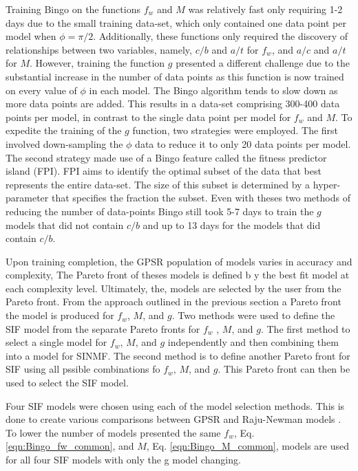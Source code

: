 Training Bingo on the functions $f_w$ and $M$ was relatively fast only requiring 1-2 days due to the small training data-set, which only contained one data point per model when $\phi = \pi/2$. Additionally, these functions only required the discovery of relationships between two variables, namely, $c/b$ and $a/t$ for $f_w$, and $a/c$ and $a/t$ for $M$. However, training the function $g$ presented a different challenge due to the substantial increase in the number of data points as this function is now trained on every value of $\phi$ in each model. The Bingo algorithm tends to slow down as more data points are added. This results in a data-set comprising 300-400 data points per model, in contrast to the single data point per model for $f_w$ and $M$. To expedite the training of the $g$ function, two strategies were employed. The first involved down-sampling the $\phi$ data to reduce it to only 20 data points per model. The second strategy made use of a Bingo feature called the fitness predictor island (FPI). FPI aims to identify the optimal subset of the data that best represents the entire data-set. The size of this subset is determined by a hyper-parameter that specifies the fraction the subset. Even with theses two methods of reducing the number of data-points Bingo still took 5-7 days to train the $g$ models that did not contain $c/b$ and up to 13 days for the models that did contain $c/b$.


Upon training completion, the GPSR population of models varies in accuracy and complexity, The Pareto front of theses models is defined b y the best fit model at each complexity level. Ultimately, the, models are selected by the user from the Pareto front. From the approach outlined in the previous section a Pareto front the model is produced for $f_w$, $M$, and $g$. Two methods were used to define the SIF model from the separate Pareto fronts for $f_w$ , $M$, and $g$. The first method to select a single model for $f_w$, $M$, and $g$ independently  and then combining them into a model for SINMF. The second method is to define another Pareto front for SIF using all pssible combinations fo $f_w$, $M$, and $g$. This Pareto front can then be used to select the SIF model. 

Four SIF models were chosen using each of the model selection methods. This is done to create various comparisons between GPSR and Raju-Newman models \cite{RNeqnsbook}. To lower the number of models presented the same $f_w$, Eq. \ref{eqn:Bingo_fw_common}, and $M$, Eq. \ref{eqn:Bingo_M_common}, models are used for all four SIF models with only the g model changing.   

